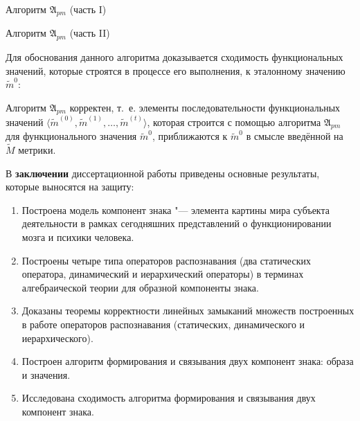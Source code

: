 \begin{algorithm}[h]
	\caption{Алгоритм $\mathfrak{A}_{pm}$ (часть I)}
	\label{alg:cycle_pm_start}
	\begin{algorithmic}[1]
		
	\end{algorithmic}
\end{algorithm}

\begin{algorithm}[h]
	\caption{Алгоритм $\mathfrak{A}_{pm}$ (часть II)}
	\label{alg:cycle_pm_end}
	\begin{algorithmic}[1]
		\algrestore{algst:store2}
		
	\end{algorithmic}
\end{algorithm}

Для обоснования данного алгоритма доказывается сходимость функциональных значений, которые строятся в процессе его выполнения, к эталонному значению $\tilde m^0$:

\begin{Theorem}
	Алгоритм $\mathfrak A_{pm}$ корректен, т.~е. элементы последовательности функциональных значений $\langle\tilde m^{(0)},\tilde m^{(1)},\dots,\tilde m^{(t)}\rangle$, которая строится с помощью алгоритма $\mathfrak A_{pm}$ для функционального значения $\tilde m^0$, приближаются к $\tilde m^0$ в смысле введённой на $\tilde M$ метрики.
\end{Theorem}

В \textbf{заключении} диссертационной работы приведены основные результаты, которые выносятся на защиту:
\begin{enumerate}
	\renewcommand\labelenumi{\theenumi.}
	\item Построена модель компонент знака "--- элемента картины мира субъекта деятельности в рамках сегодняшних представлений о функционировании мозга и психики человека.
	\item Построены четыре типа операторов распознавания (два статических оператора, динамический и иерархический операторы) в терминах алгебраической теории для образной компоненты знака.
	\item Доказаны теоремы корректности линейных замыканий множеств построенных в работе операторов распознавания (статических, динамического и иерархического).
	\item Построен алгоритм формирования и связывания двух компонент знака: образа и значения.
	\item Исследована сходимость алгоритма формирования и связывания двух компонент знака.
\end{enumerate}

